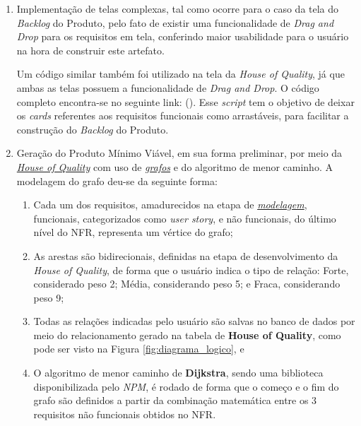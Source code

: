\begin{enumerate}
    \item Implementação de telas complexas, tal como ocorre para o caso da tela do \textit{Backlog} do Produto, pelo fato de existir uma funcionalidade de \textit{Drag and Drop} para os requisitos em tela, conferindo maior usabilidade para o usuário na hora de construir este artefato.

    \label{codigo:backlog}
    
    
    
    
    
    Um código similar também foi utilizado na tela da \textit{House of Quality}, já que ambas as telas possuem a funcionalidade de \textit{Drag and Drop}. O código completo encontra-se no seguinte link:  (\citeyear{tela_backlog_iflow}). Esse \textit{script} tem o objetivo de deixar os \textit{cards} referentes aos requisitos funcionais como arrastáveis, para facilitar a construção do \textit{Backlog} do Produto.
    
    \item Geração do Produto Mínimo Viável, em sua forma preliminar, por meio da  \hyperref[{sec:house_of_quality}]{\textit{House of Quality}} com uso de \hyperref[sec:grafos]{\textit{grafos}} e do algoritmo de menor caminho. A modelagem do grafo deu-se da seguinte forma:
    
    \begin{enumerate}
        \item Cada um dos requisitos, amadurecidos na etapa de \hyperref[{sec:modelagem_proposta}]{\textit{modelagem}}, funcionais, categorizados como \textit{user story}, e não funcionais, do último nível do NFR, representa um vértice do grafo;
        \item As arestas são bidirecionais, definidas na etapa de desenvolvimento da \textit{House of Quality}, de forma que o usuário indica o tipo de relação: Forte, considerado peso 2; Média, considerando peso 5; e Fraca, considerando peso 9;
        \item Todas as relações indicadas pelo usuário são salvas no banco de dados por meio do relacionamento gerado na tabela de \textbf{House of Quality}, como pode ser visto na Figura \ref{fig:diagrama_logico}, e
        \item O algoritmo de menor caminho de \textbf{Dijkstra}, sendo uma biblioteca disponibilizada pelo \textit{NPM}, é rodado de forma que o começo e o fim do grafo são definidos a partir da combinação matemática entre os 3 requisitos não funcionais obtidos no NFR.
    \end{enumerate}
    

\end{enumerate}
